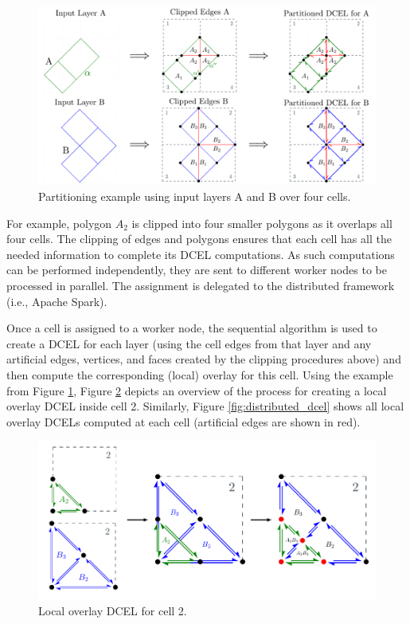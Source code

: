 \begin{figure}
    \centering
    \includegraphics[width=\textwidth]{chapterSDCEL/partition_schema/PolygonsParted}
    \caption{Partitioning example using input layers A and B over four cells.} \label{fig:partition_strategy}
\end{figure}

For example, polygon $A_2$ is clipped into four smaller polygons as it overlaps all four cells. The clipping of edges and polygons ensures that each cell has 
all the needed information to complete its DCEL computations. As such computations can be performed independently, they are sent to different worker nodes to be 
processed in parallel. The assignment is delegated to the distributed framework (i.e., Apache Spark). 

Once a cell is assigned to a worker node, the sequential algorithm is used to create a DCEL for each layer (using the cell edges from that layer and any 
artificial edges, vertices, and faces created by the clipping procedures above) and then compute the corresponding (local) overlay for this cell. Using the 
example from Figure \ref{fig:partition_strategy}, Figure \ref{fig:overlay_partition} depicts an overview of the process for creating a local overlay DCEL inside 
cell 2. Similarly, Figure \ref{fig:distributed_dcel} shows all local overlay DCELs computed at each cell (artificial edges are shown in red). 

\begin{figure}
    \centering
    \includegraphics[width=\linewidth]
    {chapterSDCEL/overlay_partition/overlay_partition}
    \caption{Local overlay DCEL for cell 2.}\label{fig:overlay_partition}
\end{figure}

